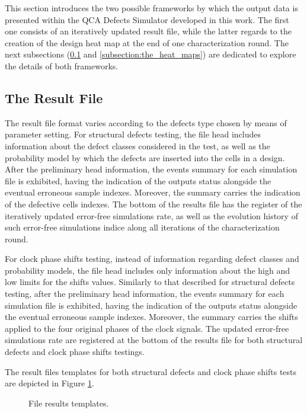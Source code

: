 This section introduces the two possible frameworks by which the output data is presented within the QCA Defects Simulator developed in this work. The first one consists of an iteratively updated result file, while the latter regards to the creation of the design heat map at the end of one characterization round. The next subsections (\ref{subsection:the_result_file} and \ref{subsection:the_heat_maps}) are dedicated to explore the details of both frameworks.

\subsection{The Result File}
\label{subsection:the_result_file}

The result file format varies according to the defects type chosen by means of parameter setting. For structural defects testing, the file head includes information about the defect classes considered in the test, as well as the probability model by which the defects are inserted into the cells in a design. After the preliminary head information, the events summary for each simulation file is exhibited, having the indication of the outputs status alongside the eventual erroneous sample indexes. Moreover, the summary carries the indication of the defective cells indexes. The bottom of the results file has the register of the iteratively updated error-free simulations rate, as well as the evolution history of such error-free simulations indice along all iterations of the characterization round.

For clock phase shifts testing, instead of information regarding defect classes and probability models, the file head includes only information about the high and low limits for the shifts values. Similarly to that described for structural defects testing, after the preliminary head information, the events summary for each simulation file is exhibited, having the indication of the outputs status alongside the eventual erroneous sample indexes. Moreover, the summary carries the shifts applied to the four original phases of the clock signals. The updated error-free simulations rate are registered at the bottom of the results file for both structural defects and clock phase shifts testings.

The result files templates for both structural defects and clock phase shifts tests are depicted in Figure \ref{figure:file_templates}.

\begin{figure}[!hb]
\center
{}
\hfill
{}
\caption{File results templates.}
\label{figure:file_templates}
\end{figure}

